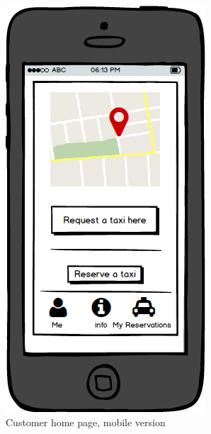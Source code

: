 \documentclass{report}
\begin{document}
			\begin{figure}[H]
			\centering
			\includegraphics[scale=0.4]{IMG/UserInterfaces/mainCustomer_m.png}
			\caption{Customer home page, mobile version}\label{visina8}
			\end{figure}
			
\end{document}

